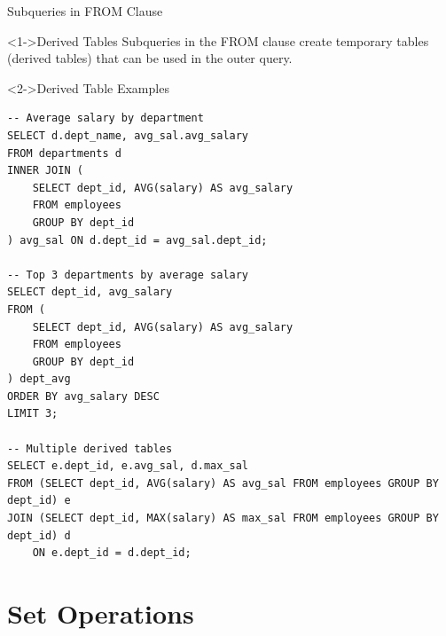 \documentclass[aspectratio=169,11pt]{beamer}
\begin{document}
\begin{frame}[fragile]{Subqueries in FROM Clause}
\begin{block}<1->{Derived Tables}
Subqueries in the FROM clause create temporary tables (derived tables) that can be used in the outer query.
\end{block}

\pause
\begin{exampleblock}<2->{Derived Table Examples}
\begin{lstlisting}
-- Average salary by department
SELECT d.dept_name, avg_sal.avg_salary
FROM departments d
INNER JOIN (
    SELECT dept_id, AVG(salary) AS avg_salary
    FROM employees
    GROUP BY dept_id
) avg_sal ON d.dept_id = avg_sal.dept_id;

-- Top 3 departments by average salary
SELECT dept_id, avg_salary
FROM (
    SELECT dept_id, AVG(salary) AS avg_salary
    FROM employees
    GROUP BY dept_id
) dept_avg
ORDER BY avg_salary DESC
LIMIT 3;

-- Multiple derived tables
SELECT e.dept_id, e.avg_sal, d.max_sal
FROM (SELECT dept_id, AVG(salary) AS avg_sal FROM employees GROUP BY dept_id) e
JOIN (SELECT dept_id, MAX(salary) AS max_sal FROM employees GROUP BY dept_id) d 
    ON e.dept_id = d.dept_id;
\end{lstlisting}
\end{exampleblock}
\end{frame}

\section{Set Operations}
\end{document}
